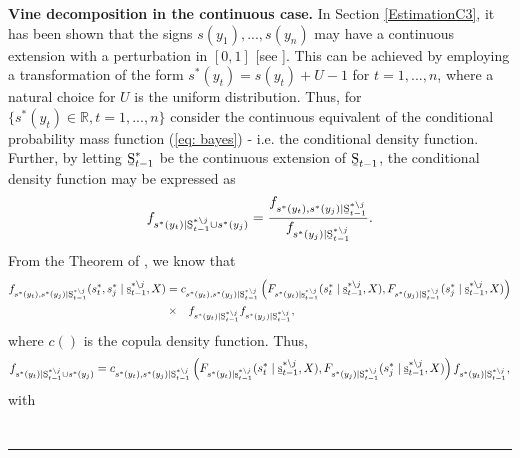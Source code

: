 \documentclass[harvard,11pt]{article}
\newenvironment{proof}[1][Proof]{\textbf{#1.} }{\  \rule{0.5em}{0.5em}}
\begin{document}
\begin{proof}[Vine decomposition in the continuous case]
In Section \ref{EstimationC3}, it has been shown that the signs $s(y_1),...,s(y_n)$ may have a continuous extension with a perturbation in $[0,1]$ [see \citet{denuit2005constraints}]. This can be achieved by employing a transformation of the form $s^*(y_t)=s(y_t)+U-1$ for $t=1,...,n$, where a natural choice for $U$ is the uniform distribution. Thus, for $\{s^*(y_t)\in \mathbb{R},t=1,...,n\}$ consider the continuous equivalent of the conditional probability mass function  (\ref{eq: bayes}) - i.e. the conditional density function. Further, by letting $\text{\b{S}}_{t-1}^{*}$ be the continuous extension of $\text{\b{S}}_{t-1}$, the conditional density function may be expressed as
\begin{equation}\label{eq: continuous}
f_{s^*(y_t)\mid \text{\b{S}}_{t-1}^{*\backslash j}\cup s^*(y_j)}=\frac{f_{s^*(y_t),s^*(y_j)\mid \text{\b{S}}_{t-1}^{*\backslash j}}}{f_{s^*(y_j)\mid \text{\b{S}}_{t-1}^{*\backslash j}}}.
\end{equation}
From the Theorem of \citet{sklar1959fonctions}, we know that
\begingroup
\allowdisplaybreaks
\begin{align}\label{eq: Sklar}
\begin{split}
f_{s^*(y_t),s^*(y_j)\mid \text{\b{S}}_{t-1}^{*\backslash j}}(s_t^*,s_j^*\mid \text{\b{s}}_{t-1}^{*\backslash j},X)&=c_{s^*(y_t),s^*(y_j)\mid \text{\b{S}}_{t-1}^{*\backslash j}}\left(F_{s^*(y_t)\mid\text{\b{s}}_{t-1}^{*\backslash j}}(s_t^*\mid \text{\b{s}}_{t-1}^{*\backslash j},X),F_{s^*(y_j)\mid\text{\b{S}}_{t-1}^{*\backslash j}}(s_j^*\mid \text{\b{s}}_{t-1}^{*\backslash j},X) \right)\\
&\times\textcolor{white}{=}f_{s^*(y_t)\mid \text{\b{S}}_{t-1}^{*\backslash j}}f_{s^*(y_j)\mid \text{\b{S}}_{t-1}^{*\backslash j}},
\end{split}
\end{align}
\endgroup
where $c()$ is the copula density function. Thus,
\begin{equation}
f_{s^*(y_t)\mid \text{\b{S}}_{t-1}^{*\backslash j}\cup s^*(y_j)}=c_{s^*(y_t),s^*(y_j)\mid \text{\b{S}}_{t-1}^{*\backslash j}}\left(F_{s^*(y_t)\mid\text{\b{s}}_{t-1}^{*\backslash j}}(s_t^*\mid \text{\b{s}}_{t-1}^{*\backslash j},X),F_{s^*(y_j)\mid\text{\b{S}}_{t-1}^{*\backslash j}}(s_j^*\mid \text{\b{s}}_{t-1}^{*\backslash j},X) \right)f_{s^*(y_t)\mid \text{\b{S}}_{t-1}^{*\backslash j}},
\end{equation}
with
\begingroup
\allowdisplaybreaks
\begin{align}

\end{align}
\end{proof}
\end{document}
